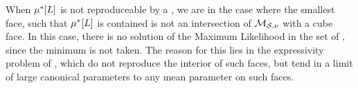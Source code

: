 When $\mu^*[L]$ is not reproduceable by a \HybridLogicNetwork{}, we are in the case where the smallest face, such that $\mu^*[L]$ is contained is not an intersection of $\mathcal{M}_{\mathcal{S},\nu}$ with a cube face.
In this case, there is no solution of the Maximum Likelihood  in the set of \HybridLogicNetworks{}, since the minimum is not taken.
The reason for this lies in the expressivity problem of \HybridLogicNetworks{}, which do not reproduce the interior of such faces, but tend in a limit of large canonical parameters to any mean parameter on such faces.

%









